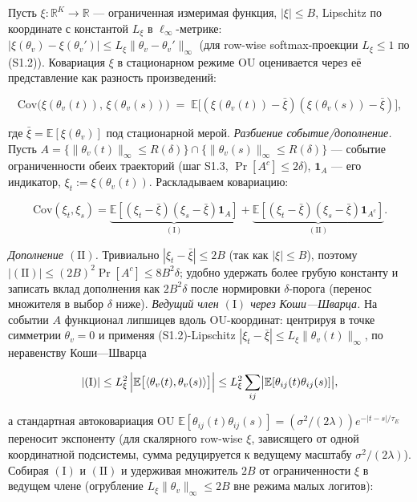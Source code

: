 \documentclass[pdflatex,sn-mathphys-ay]{sn-jnl}
\begin{document}
Пусть \(\xi: \mathbb{R}^K \to \mathbb{R}\) --- ограниченная измеримая функция, \(|\xi| \le B\), Lipschitz по координате с константой \(L_\xi\) в \(\ell_\infty\)-метрике: \(|\xi(\theta_v) - \xi(\theta_v')| \le L_\xi \|\theta_v - \theta_v'\|_\infty\) (для row-wise softmax-проекции \(L_\xi \le 1\) по (S1.2)). Ковариация \(\xi\) в стационарном режиме OU оценивается через её представление как разность произведений:



\[\text{Cov}\bigl(\xi(\theta_v(t)),\, \xi(\theta_v(s))\bigr) \;=\; \mathbb{E}\bigl[(\xi(\theta_v(t)) - \bar\xi)(\xi(\theta_v(s)) - \bar\xi)\bigr],\]



где \(\bar\xi = \mathbb{E}[\xi(\theta_v)]\) под стационарной мерой. \emph{Разбиение событие/дополнение.} Пусть \(A = \{\|\theta_v(t)\|_\infty \le R(\delta)\} \cap \{\|\theta_v(s)\|_\infty \le R(\delta)\}\) --- событие ограниченности обеих траекторий (шаг S1.3, \(\Pr[A^c] \le 2\delta\)), \(\mathbf{1}_A\) --- его индикатор, \(\xi_t := \xi(\theta_v(t))\). Раскладываем ковариацию:



\[\text{Cov}(\xi_t, \xi_s) = \underbrace{\mathbb{E}[(\xi_t-\bar\xi)(\xi_s-\bar\xi)\mathbf{1}_A]}_{(\mathrm{I})} + \underbrace{\mathbb{E}[(\xi_t-\bar\xi)(\xi_s-\bar\xi)\mathbf{1}_{A^c}]}_{(\mathrm{II})}.\]



\emph{Дополнение \((\mathrm{II})\).} Тривиально \(|\xi_t-\bar\xi| \le 2B\) (так как \(|\xi| \le B\)), поэтому \(|(\mathrm{II})| \le (2B)^2 \Pr[A^c] \le 8B^2\delta\); удобно удержать более грубую константу и записать вклад дополнения как \(2B^2\delta\) после нормировки \(\delta\)-порога (перенос множителя в выбор \(\delta\) ниже). \emph{Ведущий член \((\mathrm{I})\) через Коши---Шварца.} На событии \(A\) функционал липшицев вдоль OU-координат: центрируя в точке симметрии \(\theta_v = 0\) и применяя (S1.2)-Lipschitz \(|\xi_t-\bar\xi| \le L_\xi\|\theta_v(t)\|_\infty\), по неравенству Коши---Шварца



\[|(\mathrm{I})| \le L_\xi^2\,\Bigl|\mathbb{E}\bigl[\langle\theta_v(t),\theta_v(s)\rangle\bigr]\Bigr| \le L_\xi^2 \sum_{ij}\bigl|\mathbb{E}[\theta_{ij}(t)\theta_{ij}(s)]\bigr|,\]



а стандартная автоковариация OU \(\mathbb{E}[\theta_{ij}(t)\theta_{ij}(s)] = (\sigma^2/(2\lambda)) e^{-|t-s|/\tau_E}\) переносит экспоненту (для скалярного row-wise \(\xi\), зависящего от одной координатной подсистемы, сумма редуцируется к ведущему масштабу \(\sigma^2/(2\lambda)\)). Собирая \((\mathrm{I})\) и \((\mathrm{II})\) и удерживая множитель \(2B\) от ограниченности \(\xi\) в ведущем члене (огрубление \(L_\xi\|\theta_v\|_\infty \le 2B\) вне режима малых логитов):
\end{document}
